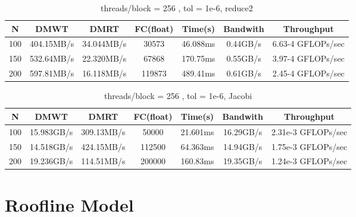 \documentclass{amsart} %
\begin{document}
\begin{table}[ht]
	\caption{threads/block = 256 , tol = 1e-6, reduce2} %
	\centering %
	\begin{tabular}{c c c c c c c} %
		\hline\hline %
		N & DMWT & DMRT & FC(float) &Time(s) & Bandwith & Throughput\\ [0.5ex] %
		\hline %
		100 & 404.15MB/s & 34.044MB/s & 30573 & 46.088ms & 0.44GB/s & 6.63-4 GFLOPs/sec\\ %
		150 & 532.64MB/s & 22.320MB/s & 67868 & 170.75ms & 0.55GB/s & 3.97-4 GFLOPs/sec\\
		200 & 597.81MB/s & 16.118MB/s & 119873 &489.41ms & 0.61GB/s & 2.45-4 GFLOPs/sec\\[1ex] %
		\hline %
	\end{tabular}
	\label{table:nonlin} %
\end{table}
\FloatBarrier

\begin{table}[ht]
	\caption{threads/block = 256 , tol = 1e-6, Jacobi} %
	\centering %
	\begin{tabular}{c c c c c c c} %
		\hline\hline %
		N & DMWT & DMRT & FC(float) &Time(s) & Bandwith & Throughput\\ [0.5ex] %
		\hline %
		100 & 15.983GB/s & 309.13MB/s & 50000 & 21.601ms & 16.29GB/s & 2.31e-3 GFLOPs/sec\\ %
		150 & 14.518GB/s & 424.15MB/s & 112500 &64.363ms  & 14.94GB/s & 1.75e-3 GFLOPs/sec\\
		200 & 19.236GB/s & 114.51MB/s & 200000 &160.83ms & 19.35GB/s & 1.24e-3 GFLOPs/sec\\[1ex] %
		\hline %
	\end{tabular}
	\label{table:nonlin} %
\end{table}
\FloatBarrier



 
\section{Roofline Model}
\end{document}
